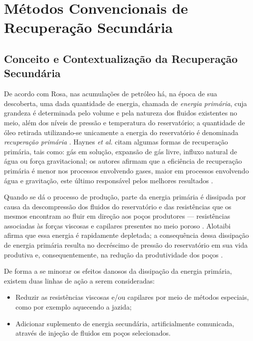 
\section{M\'{e}todos Convencionais de Recupera\c{c}\~{a}o Secund\'{a}ria}

\subsection{Conceito e Contextualiza\c{c}\~{a}o da Recupera\c{c}\~{a}o Secund\'{a}ria}

De acordo com Rosa, nas acumula\c{c}\~{o}es de petr\'{o}leo h\'{a}, na \'{e}poca de sua descoberta, uma dada quantidade de energia, chamada de \textit{energia prim\'{a}ria}, cuja grandeza \'{e} determinada pelo volume e pela natureza dos fluidos existentes no meio, al\'{e}m dos n\'{i}veis de press\~{a}o e temperatura do reservat\'{o}rio; a quantidade de \'{o}leo retirada utilizando-se unicamente a energia do reservat\'{o}rio \'{e} denominada \textit{recupera\c{c}\~{a}o prim\'{a}ria} \cite{engres}. Haynes \textit{et al.} citam algumas formas de recuperação primária, tais como: gás em solução, expansão de gás livre, influxo natural de água ou força gravitacional; os autores afirmam que a eficiência de recuperação primária é menor nos processos envolvendo gases, maior em processos envolvendo água e gravitação, este último responsável pelos melhores resultados \cite{oil1976}.

Quando se d\'{a} o processo de produ\c{c}\~{a}o, parte da energia prim\'{a}ria \'{e} dissipada por causa da descompress\~{a}o dos fluidos do reservat\'{o}rio e das resist\^{e}ncias que os mesmos encontram ao fluir em dire\c{c}\~{a}o aos po\c{c}os produtores --- resist\^{e}ncias associadas \`{a}s for\c{c}as viscosas e capilares presentes no meio poroso \cite{engres}. Alotaibi afirma que essa energia é rapidamente depletada; a consequ\^{e}ncia dessa dissipa\c{c}\~{a}o de energia prim\'{a}ria resulta no decr\'{e}scimo de press\~{a}o do reservat\'{o}rio em sua vida produtiva e, consequentemente, na redu\c{c}\~{a}o da produtividade dos po\c{c}os \cite{alotaibi}. 

De forma a se minorar os efeitos danosos da dissipa\c{c}\~{a}o da energia prim\'{a}ria, existem duas linhas de a\c{c}\~{a}o a serem consideradas:

\begin{itemize}
\item Reduzir as resist\^{e}ncias viscosas e/ou capilares por meio de m\'{e}todos especiais, como por exemplo aquecendo a jazida;
\item Adicionar suplemento de energia secund\'{a}ria, artificialmente comunicada, atrav\'{e}s de inje\c{c}\~{a}o de fluidos em po\c{c}os selecionados.
\end{itemize}

